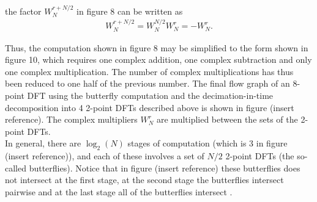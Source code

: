 the factor $W_N^{r+N/2}$ in figure 8 can be written as
\begin{align*}
W_N^{r+N/2} = W_N^{N/2} W_N^r = -W_N^r.
\end{align*}

Thus, the computation shown in figure 8 may be simplified to the form shown in figure 10, which requires one complex addition, one complex subtraction and only one complex multiplication. The number of complex multiplications has thus been reduced to one half of the previous number. The final flow graph of an 8-point DFT using the butterfly computation and the decimation-in-time decomposition into 4 2-point DFTs described above is shown in figure (insert reference). The complex multipliers $W_N^r$ are multiplied between the sets of the 2-point DFTs.
\\
In general, there are $\log_2(N)$ stages of computation (which is 3 in figure (insert reference)), and each of these involves a set of $N/2$ 2-point DFTs (the so-called butterflies). Notice that in figure (insert reference) these butterflies does not intersect at the first stage, at the second stage the butterflies intersect pairwise and at the last stage all of the butterflies intersect .